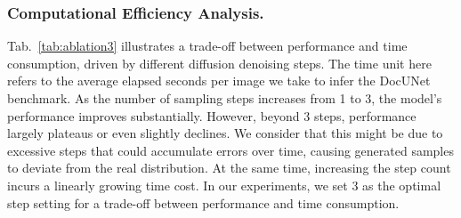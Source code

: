 \begin{table}[tp]
\caption{Ablations on sampling step, performance, and time consumption.}
\vspace{-5pt}
\centering
{}
\label{tab:ablation3} 
\end{table}

\begin{table}[tp]
\caption{Ablations study for different latent size.}
\vspace{-5pt}
\centering
{}
\label{tab:ablation4} 
\end{table}

\subsubsection{Computational Efficiency Analysis.}
Tab.~\ref{tab:ablation3} illustrates a trade-off between performance and time consumption, driven by different diffusion denoising steps. The time unit here refers to the average elapsed seconds per image we take to infer the DocUNet~\cite{ma2018docunet} benchmark. As the number of sampling steps increases from 1 to 3, the model’s performance improves substantially. However, beyond 3 steps, performance largely plateaus or even slightly declines. We consider that this might be due to excessive steps that could accumulate errors over time, causing generated samples to deviate from the real distribution. At the same time, increasing the step count incurs a linearly growing time cost. In our experiments, we set 3 as the optimal step setting for a trade-off between performance and time consumption.


